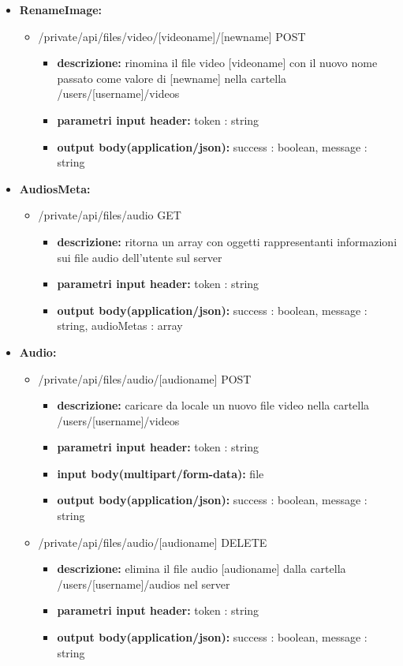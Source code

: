 {{\begin{itemize}
		\item \textbf{RenameImage:}
			\begin{itemize}
			\item   /private/api/files/video/[videoname]/[newname] POST
				\begin{itemize} 
				\item \textbf{descrizione:} rinomina il file video [videoname] con il nuovo nome passato come valore di [newname] nella cartella /users/[username]/videos
				\item \textbf{parametri input header:} token : string
				\item \textbf{output body(application/json):}  success : boolean, message : string
				\end{itemize}
			\end{itemize}
			
		\item \textbf{AudiosMeta:}
			\begin{itemize}
			\item   /private/api/files/audio GET
				\begin{itemize} 
				\item \textbf{descrizione:} ritorna un array con oggetti rappresentanti informazioni sui file audio dell'utente sul server
				\item \textbf{parametri input header:} token : string
				\item \textbf{output body(application/json):}  success : boolean, message : string, audioMetas : array
				\end{itemize}
			\end{itemize}
			
		\item \textbf{Audio:}
			\begin{itemize}
			\item    /private/api/files/audio/[audioname] POST
				\begin{itemize} 
				\item \textbf{descrizione:} caricare da locale un nuovo file video nella cartella /users/[username]/videos					
				\item \textbf{parametri input header:} token : string
				\item \textbf{input body(multipart/form-data):} file   
				\item \textbf{output body(application/json):}  success : boolean, message : string
				\end{itemize}
			\item    /private/api/files/audio/[audioname] DELETE
				\begin{itemize} 
				\item \textbf{descrizione:} elimina il file audio [audioname] dalla cartella /users/[username]/audios nel server				
				\item \textbf{parametri input header:} token : string
				\item \textbf{output body(application/json):}  success : boolean, message : string
				\end{itemize}
			\end{itemize}
			

\end{itemize}}}

